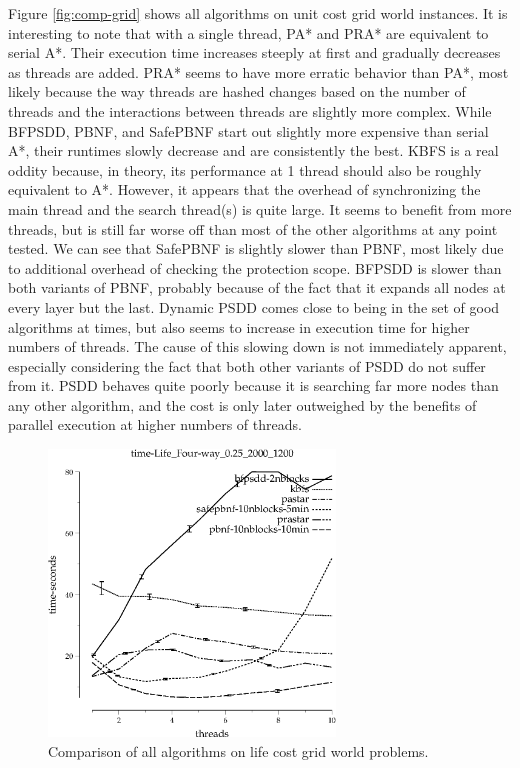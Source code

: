 \documentclass{article}
\begin{document}
Figure \ref{fig:comp-grid} shows all algorithms on unit cost grid world instances. It is interesting to note that with a single thread, PA* and PRA* are equivalent to serial A*. Their execution time increases steeply at first and gradually decreases as threads are added. PRA* seems to have more erratic behavior than PA*, most likely because the way threads are hashed changes based on the number of threads and the interactions between threads are slightly more complex. While BFPSDD, PBNF, and SafePBNF start out slightly more expensive than serial A*, their runtimes slowly decrease and are consistently the best. KBFS is a real oddity because, in theory, its performance at 1 thread should also be roughly equivalent to A*. However, it appears that the overhead of synchronizing the main thread and the search thread(s) is quite large. It seems to benefit from more threads, but is still far worse off than most of the other algorithms at any point tested. We can see that SafePBNF is slightly slower than PBNF, most likely due to additional overhead of checking the protection scope. BFPSDD is slower than both variants of PBNF, probably because of the fact that it expands all nodes at every layer but the last. Dynamic PSDD comes close to being in the set of good algorithms at times, but also seems to increase in execution time for higher numbers of threads. The cause of this slowing down is not immediately apparent, especially considering the fact that both other variants of PSDD do not suffer from it. PSDD behaves quite poorly because it is searching far more nodes than any other algorithm, and the cost is only later outweighed by the benefits of parallel execution at higher numbers of threads.

\begin{figure}[h!]
\includegraphics[width=3in]{../graphs/seth/time-Life_Four-way_0.25_2000_1200.eps}
\caption{Comparison of all algorithms on life cost grid world problems.}
\label{fig:comp-life}
\end{figure}
\end{document}
